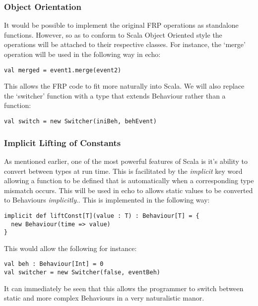 \documentclass[12pt]{article}
\begin{document}
      \subsubsection{Object Orientation}
        It would be possible to implement the original FRP operations as standalone functions. However, so
        as to conform to Scala Object Oriented style the operations will be attached to their respective
        classes. For instance, the `merge' operation will be used in the following way in echo:
        
\begin{verbatim}
val merged = event1.merge(event2)
\end{verbatim}

      This allows the FRP code to fit more naturally into Scala. We will also replace the `switcher' function
      with a type that extends Behaviour rather than a function:
      
\begin{verbatim}
val switch = new Switcher(iniBeh, behEvent)
\end{verbatim}

      \subsubsection{Implicit Lifting of Constants}
        As mentioned earlier, one of the most powerful features of Scala is it's ability to convert between
        types at run time. This is facilitated by the \emph{implicit} key word allowing a function to be defined
        that is automatically when a corresponding type mismatch occurs. This will be used in echo to allows 
        static values to be converted to Behaviours \emph{implicitly}.. This is implemented in the following way:  

\begin{verbatim}
implicit def liftConst[T](value : T) : Behaviour[T] = {
  new Behaviour(time => value)
}
\end{verbatim}              
        
        This would allow the following for instance:
 
\begin{verbatim}
val beh : Behaviour[Int] = 0
val switcher = new Switcher(false, eventBeh)
\end{verbatim}       

        It can immediately be seen that this allows the programmer to switch between static and more complex
        Behaviours in a very naturalistic manor.
      
\end{document}

